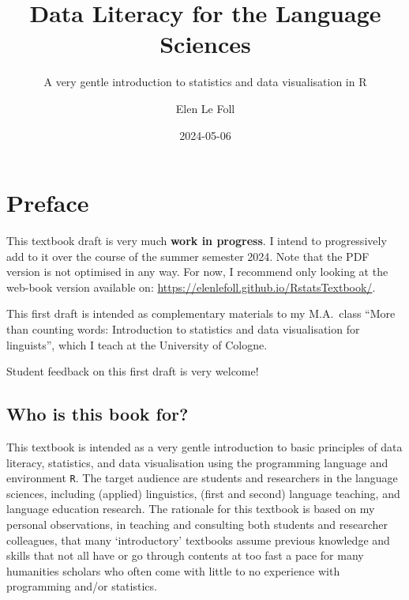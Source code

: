 \documentclass[
  letterpaper,
  DIV=11,
  numbers=noendperiod,
  oneside]{scrreprt}
\title{Data Literacy for the Language Sciences}
\subtitle{A very gentle introduction to statistics and data
visualisation in R}
\author{Elen Le Foll}
\date{2024-05-06}
\renewcommand*\contentsname{Table of contents}
\newcommand\contentsname{Table of contents}
\begin{document}
\maketitle

\renewcommand*\contentsname{Table of contents}
{
\hypersetup{linkcolor=}
\setcounter{tocdepth}{2}
\tableofcontents
}

\chapter*{Preface}\label{preface}


\begin{tcolorbox}[enhanced jigsaw, breakable, colbacktitle=quarto-callout-warning-color!10!white, bottomtitle=1mm, colframe=quarto-callout-warning-color-frame, leftrule=.75mm, bottomrule=.15mm, colback=white, toptitle=1mm, rightrule=.15mm, title=\textcolor{quarto-callout-warning-color}{\faExclamationTriangle}\hspace{0.5em}{Warning}, coltitle=black, opacityback=0, arc=.35mm, left=2mm, titlerule=0mm, toprule=.15mm, opacitybacktitle=0.6]

This textbook draft is very much \textbf{work in progress}. I intend to
progressively add to it over the course of the summer semester 2024.
Note that the PDF version is not optimised in any way. For now, I
recommend only looking at the web-book version available on:
\url{https://elenlefoll.github.io/RstatsTextbook/}.

This first draft is intended as complementary materials to my M.A.~class
``More than counting words: Introduction to statistics and data
visualisation for linguists'', which I teach at the University of
Cologne.

Student feedback on this first draft is very welcome!

\end{tcolorbox}

\section*{Who is this book for?}\label{who-is-this-book-for}


This textbook is intended as a very gentle introduction to basic
principles of data literacy, statistics, and data visualisation using
the programming language and environment \texttt{R}. The target audience
are students and researchers in the language sciences, including
(applied) linguistics, (first and second) language teaching, and
language education research. The rationale for this textbook is based on
my personal observations, in teaching and consulting both students and
researcher colleagues, that many `introductory' textbooks assume
previous knowledge and skills that not all have or go through contents
at too fast a pace for many humanities scholars who often come with
little to no experience with programming and/or statistics.
\end{document}
